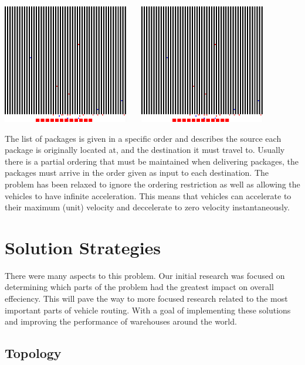 \documentclass[11pt]{article}
\begin{document}
\begin{center}
\includegraphics[height=200px]{topo_1.png} \ \ \ 
\includegraphics[height=200px]{topo_2.png}
\end{center}

The list of packages is given in a specific order and describes the source each package is originally located at, and the destination it must travel to. Usually there is a partial ordering that must be maintained when delivering packages, the packages must arrive in the order given as input to each destination. The problem has been relaxed to ignore the ordering restriction as well as allowing the vehicles to have infinite acceleration. This means that vehicles can accelerate to their maximum (unit) velocity and deccelerate to zero velocity instantaneously.

\section{Solution Strategies}

There were many aspects to this problem. Our initial research was focused on determining which parts of the problem had the greatest impact on overall effeciency. This will pave the way to more focused research related to the most important parts of vehicle routing. With a goal of implementing these solutions and improving the performance of warehouses around the world.

\subsection{Topology}
\end{document}
